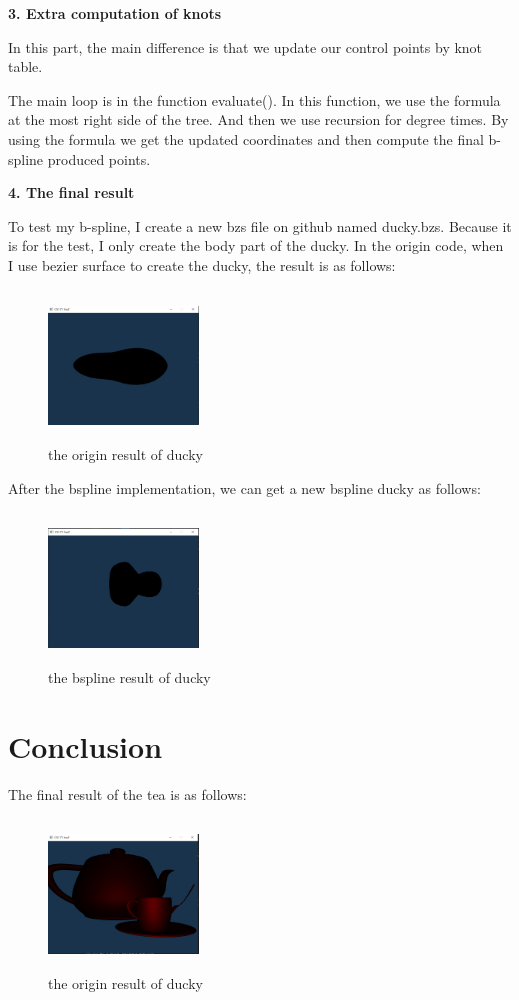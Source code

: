 \documentclass[acmtog]{acmart}
\begin{document}
\textbf{3. Extra computation of knots}

In this part, the main difference is that we update our control points by knot table.

The main loop is in the function evaluate(). In this function, we use the formula at the most right side
of the tree. And then we use recursion for degree times. By using the formula we get the updated coordinates
and then compute the final b-spline produced points.

\textbf{4. The final result}

To test my b-spline, I create a new bzs file on github named ducky.bzs. Because it is for the test, I only create the body part
of the ducky. In the origin code, when I use bezier surface to create the ducky, the result is as follows:

\begin{figure}[h]
\includegraphics[width=4cm,height=4cm]{origin_ducky}
\caption{the origin result of ducky}
\end{figure}

After the bspline implementation, we can get a new bspline ducky as follows:

\begin{figure}[h]
\includegraphics[width=4cm,height=4cm]{bspline_ducky}
\caption{the bspline result of ducky}
\end{figure}

\section{Conclusion}

The final result of the tea is as follows:

\begin{figure}[h]
\includegraphics[width=4cm,height=4cm]{final_result}
\caption{the origin result of ducky}
\end{figure}
\end{document}
